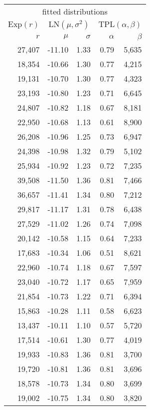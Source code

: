 \begin{tabular}{@{}rrrrr@{}}
\toprule
\multicolumn{5}{c}{fitted distributions}\\
\cmidrule(lr){1-5}
$\text{Exp}(r)$ & \multicolumn{2}{c}{$\text{LN}(\mu, \sigma^2)$} & \multicolumn{2}{c}{$\text{TPL}(\alpha, \beta)$}\\
\cmidrule(lr){1-5}
$r$ & $\mu$ & $\sigma$ & $\alpha$ & $\beta$\\
\cmidrule(lr){1-1} \cmidrule(lr){2-3} \cmidrule(lr){4-5}
27,407 & -11.10 & 1.33 & 0.79 & 5,635 \\
18,354 & -10.66 & 1.30 & 0.77 & 4,215 \\
19,131 & -10.70 & 1.30 & 0.77 & 4,323 \\
23,193 & -10.80 & 1.23 & 0.71 & 6,645 \\
24,807 & -10.82 & 1.18 & 0.67 & 8,181 \\
22,950 & -10.68 & 1.13 & 0.61 & 8,900 \\
26,208 & -10.96 & 1.25 & 0.73 & 6,947 \\
24,398 & -10.98 & 1.32 & 0.79 & 5,102 \\
25,934 & -10.92 & 1.23 & 0.72 & 7,235 \\
39,508 & -11.50 & 1.36 & 0.81 & 7,466 \\
36,657 & -11.41 & 1.34 & 0.80 & 7,212 \\
29,817 & -11.17 & 1.31 & 0.78 & 6,438 \\
27,529 & -11.02 & 1.26 & 0.74 & 7,098 \\
20,142 & -10.58 & 1.15 & 0.64 & 7,233 \\
17,683 & -10.34 & 1.06 & 0.51 & 8,621 \\
22,960 & -10.74 & 1.18 & 0.67 & 7,597 \\
23,040 & -10.72 & 1.17 & 0.65 & 7,959 \\
21,854 & -10.73 & 1.22 & 0.71 & 6,394 \\
15,863 & -10.28 & 1.11 & 0.58 & 6,623 \\
13,437 & -10.11 & 1.10 & 0.57 & 5,720 \\
17,514 & -10.61 & 1.30 & 0.77 & 4,019 \\
19,933 & -10.83 & 1.36 & 0.81 & 3,700 \\
19,720 & -10.81 & 1.36 & 0.81 & 3,696 \\
18,578 & -10.73 & 1.34 & 0.80 & 3,699 \\
19,002 & -10.75 & 1.34 & 0.80 & 3,820 \\
\bottomrule
\end{tabular}
